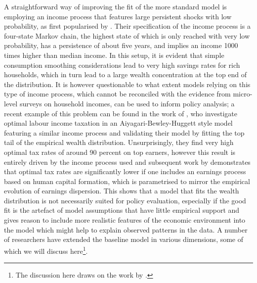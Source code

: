 A straightforward way of improving the fit of the more standard model is employing an
income process that features large persistent shocks with low probability, as 
first popularised by \citet{CastanedaRiosRull2003}. Their specification of the 
income process is a four-state Markov chain, the highest state of which is only
reached with very low probability, has a persistence of about five years, and
implies an income 1000 times higher than median income. In this setup, it is evident
that simple consumption smoothing considerations lead to very high savings rates
for rich households, which in turn lead to a large wealth concentration at the 
top end of the distribution. It is however questionable to what extent models 
relying on this type of income process, which cannot be reconciled with the 
evidence from micro-level surveys on household incomes, can be used to inform 
policy analysis; a recent example of this problem can be found in the work of 
\cite{KindermannKrueger2014}, who investigate optimal labour income taxation
in an Aiyagari-Bewley-Huggett style model featuring a similar income process and
validating their model by fitting the top tail of the empirical wealth distribution.
Unsurprisingly, they find very high optimal tax rates of around 90 percent on 
top earners, however this result is entirely driven by the income process used
and subsequent work by \cite{BadelHuggett2014} demonstrates that optimal tax
rates are significantly lower if one includes an earnings process based on 
human capital formation, which is parametrised to mirror the empirical evolution
of earnings dispersion.
This shows that a model that fits the wealth distribution is not necessarily 
suited for policy evaluation, especially if the good fit is the artefact of
model assumptions that have little empirical support and gives reason to 
include more realistic features of the economic environment into the model 
which might help to explain observed patterns in the data. A number of researchers
have extended the baseline model in various dimensions, some of which we will 
discuss here\footnote{The discussion here draws on the work by \cite{DeNardi2015}.}.

